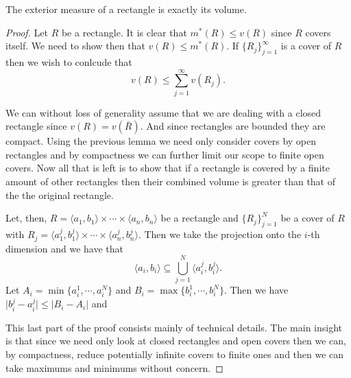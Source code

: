 \documentclass[12pt,oneside]{book}
\numberwithin{table}{section}
\numberwithin{equation}{section}
\numberwithin{figure}{section}
\newcommand{\abs}[1]{\lvert #1 \rvert}
\newcommand{\ext}[1]{m^* \! \left( #1 \right)}
\begin{document}
\begin{lemma} \label{lemma:exterior measure of rectangle}
	The exterior measure of a rectangle is exactly its volume.
\end{lemma}
\begin{proof}
	Let \( R \) be a rectangle. It is clear that \( \ext{R} \leq v(R) \) since \( R \) covers itself. We need to show then that \( v(R) \leq \ext{R} \). If \( \{ R_j \}_{j = 1}^\infty \) is a cover of \( R \) then we wish to conlcude that
	\begin{equation*}
		v(R) \leq \sum_{j = 1}^{\infty}v(R_j). 
	\end{equation*}

	We can without loss of generality assume that we are dealing with a closed rectangle since \( v(R) = v(\bar{R}) \). And since rectangles are bounded they are compact. Using the previous lemma we need only consider covers by open rectangles and by compactness we can further limit our scope to finite open covers. Now all that is left is to show that if a rectangle is covered by a finite amount of other rectangles then their combined volume is greater than that of the the original rectangle. 

	Let, then, \( R = \langle a_1,b_1 \rangle \times \cdots \times \langle a_n,b_n \rangle \) be a rectangle and \( \{ R_j \}_{j = 1}^N \) be a cover of \( R \) with \( R_j = \langle a^j_1,b^j_1 \rangle \times \cdots \times \langle a^j_n,b^j_n \rangle \). Then we take the projection onto the \( i \)-th dimension and we have that
	\begin{equation*}
		\langle a_i, b_i \rangle \subseteq \bigcup_{j = 1}^N \langle a^j_i, b^j_i \rangle.
	\end{equation*}
	Let \( A_i = \min \{ a^1_i, \cdots, a^N_i \} \) and \( B_i = \max \{ b^1_i, \cdots, b^N_i \} \). Then we have \( \abs{b^j_i - a^j_i} \leq \abs{B_i - A_i} \) and 

	This last part of the proof consists mainly of technical details. The main insight is that since we need only look at closed rectangles and open covers then we can, by compactness, reduce potentially infinite covers to finite ones and then we can take maximums and minimums without concern.
\end{proof}
\end{document}
